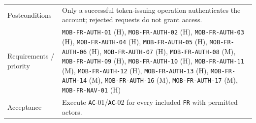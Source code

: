 \begin{longtable}{@{}P{0.20000\SRSWidth}P{0.80000\SRSWidth}@{}}
Postconditions & Only a successful token-issuing operation authenticates the account; rejected requests do not grant access. \\[3pt]
Requirements /\allowbreak{} priority & \texttt{MOB-\allowbreak{}FR-\allowbreak{}AUTH-\allowbreak{}01} (H), \texttt{MOB-\allowbreak{}FR-\allowbreak{}AUTH-\allowbreak{}02} (H), \texttt{MOB-\allowbreak{}FR-\allowbreak{}AUTH-\allowbreak{}03} (H), \texttt{MOB-\allowbreak{}FR-\allowbreak{}AUTH-\allowbreak{}04} (H), \texttt{MOB-\allowbreak{}FR-\allowbreak{}AUTH-\allowbreak{}05} (H), \texttt{MOB-\allowbreak{}FR-\allowbreak{}AUTH-\allowbreak{}06} (H), \texttt{MOB-\allowbreak{}FR-\allowbreak{}AUTH-\allowbreak{}07} (H), \texttt{MOB-\allowbreak{}FR-\allowbreak{}AUTH-\allowbreak{}08} (M), \texttt{MOB-\allowbreak{}FR-\allowbreak{}AUTH-\allowbreak{}09} (H), \texttt{MOB-\allowbreak{}FR-\allowbreak{}AUTH-\allowbreak{}10} (H), \texttt{MOB-\allowbreak{}FR-\allowbreak{}AUTH-\allowbreak{}11} (M), \texttt{MOB-\allowbreak{}FR-\allowbreak{}AUTH-\allowbreak{}12} (H), \texttt{MOB-\allowbreak{}FR-\allowbreak{}AUTH-\allowbreak{}13} (H), \texttt{MOB-\allowbreak{}FR-\allowbreak{}AUTH-\allowbreak{}14} (M), \texttt{MOB-\allowbreak{}FR-\allowbreak{}AUTH-\allowbreak{}16} (M), \texttt{MOB-\allowbreak{}FR-\allowbreak{}AUTH-\allowbreak{}17} (M), \texttt{MOB-\allowbreak{}FR-\allowbreak{}NAV-\allowbreak{}01} (H) \\[3pt]
Acceptance & Execute \texttt{AC}-01/\allowbreak{}\texttt{AC}-02 for every included \texttt{FR} with permitted actors. \\[3pt]
\end{longtable}
\endgroup

